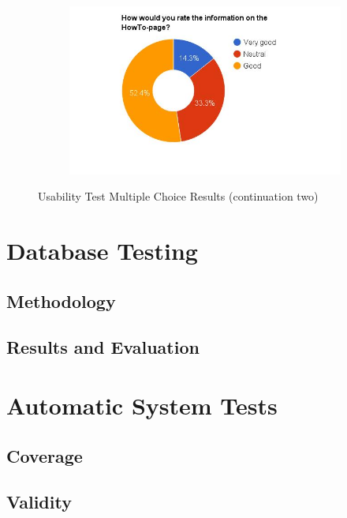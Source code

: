 \begin{figure}
    \hspace*{-1.5cm}
    \begin{subfigure}[h]{0.5\textwidth}
        \includegraphics[width=1.5\textwidth, height=1.0\textwidth]{results/howto_cmb.jpg}
        \caption{}
        \label{fig:cmb-howto}
    \end{subfigure}
    \caption{Usability Test Multiple Choice Results (continuation two)}
    \label{fig:multiplechoice2}
\end{figure}


\section{Database Testing}

\subsection{Methodology}

\subsection{Results and Evaluation}

\section{Automatic System Tests}

\subsection{Coverage}

\subsection{Validity}
